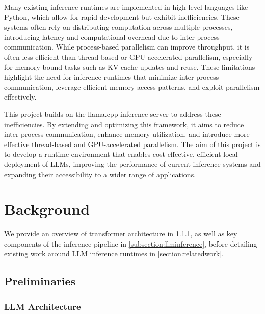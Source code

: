 \documentclass[12pt,twoside]{report}
\begin{document}
Many existing inference runtimes are implemented in high-level languages like Python, which allow for rapid development but exhibit inefficiencies. 
These systems often rely on distributing computation across multiple processes, introducing latency and computational overhead due to inter-process communication. 
While process-based parallelism can improve throughput, it is often less efficient than thread-based or GPU-accelerated parallelism, especially for memory-bound tasks such as KV cache updates and reuse.
These limitations highlight the need for inference runtimes that minimize inter-process communication, leverage efficient memory-access patterns, and exploit parallelism effectively.

This project builds on the llama.cpp inference server to address these inefficiencies. 
By extending and optimizing this framework, it aims to reduce inter-process communication, enhance memory utilization, and introduce more effective thread-based and GPU-accelerated parallelism. 
The aim of this project is to develop a runtime environment that enables cost-effective, efficient local deployment of LLMs, improving the performance of current inference systems and expanding their accessibility to a wider range of applications.

\chapter{Background} %
We provide an overview of transformer architecture in \ref{subsection:llmarchitecture}, as well as key components of the inference pipeline in \ref{subsection:llminference}, before detailing existing work around LLM inference runtimes in \ref{section:relatedwork}.
\section{Preliminaries}
\subsection{LLM Architecture}\label{subsection:llmarchitecture}
\end{document}
